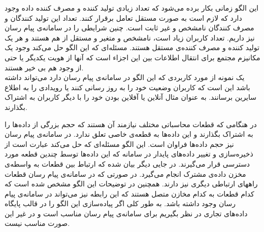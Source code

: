 این الگو زمانی بکار برده می‌شود که تعداد زیادی تولید کننده و مصرف کننده داده وجود دارد که لازم است به صورت مستقل تعامل برقرار کنند. تعداد این تولید کنندگان و مصرف کنندگان نامشخص و غیر ثابت است. چنین شرایطی را در سامانه‌ی پیام رسان نیز داریم. تعداد کاربران زیاد است، نامشخص و متغیر و مستقل از هم هستند و هر یک تولید کننده و مصرف کننده‌ی مستقل هستند. مسئله‌ای که این الگو حل می‌کند وجود یک مکانیزم مجتمع برای انتقال اطلاعات بین این اجزاء است که آنها از هویت یکدیگر یا حتی از وجود هم بی خیر هستند. \\
یک نمونه از مورد کاربردی که این الگو در سامانه‌ی پیام رسان دارد می‌تواند داشته باشد این است که کاربران وضعیت خود را به روز رسانی کنند یا رویدادی را به اطلاع سایرین برسانند. به عنوان مثال آنلاین یا آفلاین بودن خود را با دیگر کاربران به اشتراک بگذارند.

در هنگامی که قطعات   محاسباتی مختلف نیازمند آن هستند که حجم بزرگی از داده‌ها را به اشتراک بگذارند و این داده‌ها به قطعه‌ی خاصی تعلق ندارد. در سامانه‌ی پیام‌ رسان نیز حجم داده‌ها فراوان است. این الگو مسئله‌ای که حل می‌کند عبارت است از ذخیره‌سازی و تغییر داده‌های پایدار در سامانه که این داده‌ها توسط چندین قطعه مورد دسترسی قرار می‌گیرند. در جایی دیگر بیان شده که ارتباط بین قطعات به واسطه‌ی مخزن داده‌ی مشترک  انجام می‌گیرد. در صورتی که در سامانه‌ی پیام رسان قطعات راههای ارتباطی دیگری نیز دارند. همچنین در توضیحات این الگو مشخص شده است که کدام قطعات به کدام مخازن متصل هستند که این رابطه نیز می‌تواند در سامانه‌ی پیام رسان وجود داشته باشد. به طور کلی اگر پیاده‌سازی این الگو را در قالب پایگاه داده‌های تجاری در نظر بگیریم برای سامانه‌ی پیام رسان مناسب است و در غیر این صورت مناسب نیست.
















